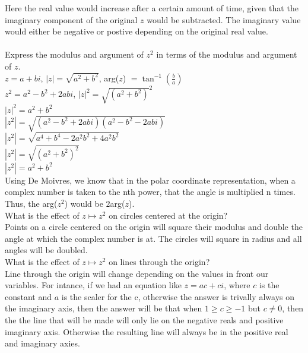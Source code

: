 \documentclass[12pt]{article}
\begin{document}
Here the real value would increase after a certain amount of time, given that the imaginary component of the original $z$ would be subtracted.
The imaginary value would either be negative or postive depending on the original real value.\\


\\


 Express the modulus and argument of $z^2$ in terms of the modulus and argument of $z$.\\


$z = a + bi$, $|z| = \sqrt{a^2+b^2}$, arg($z$) $ = \tan^{-1}(\frac{b}{a})$\\
$z^2 = a^2 - b^2 + 2abi$, $|z|^2 = \sqrt{(a^2 + b^2)}^2$\\
$|z|^2 = a^2 + b^2$\\
$|z^2| = \sqrt{(a^2-b^2+2abi)(a^2-b^2-2abi)}$\\
$|z^2| = \sqrt{a^4 + b^4 - 2a^2b^2 + 4a^2b^2}$\\
$|z^2| = \sqrt{(a^2+b^2)^2}$\\
$|z^2| = a^2+b^2$\\

Using De Moivres, we know that in the polar coordinate representation, when a complex number is taken to the nth power, that the angle is multiplied n times.
Thus, the arg($z^2$) would be $2$arg($z$).\\


 What is the effect of $z \mapsto z^2$ on circles centered at the origin?\\
Points on a circle centered on the origin will square their modulus and double the angle at which the complex number is at.
The circles will square in radius and all angles will be doubled.\\ 

 What is the effect of $z \mapsto z^2$ on lines through the origin?\\
Line through the origin will change depending on the values in front our variables.
For intance, if we had an equation like $z = ac + ci$, where $c$ is the constant and $a$ is the scaler for the c, otherwise the answer is trivally always on the imaginary axis, then the answer will be that when $1 \geq c \geq -1$
but $c \neq 0$, then the the line that will be made will only lie on the negative reals and positive imaginary axis. 
Otherwise the resulting line will always be in the positive real and imaginary axies.\\
\end{document}
